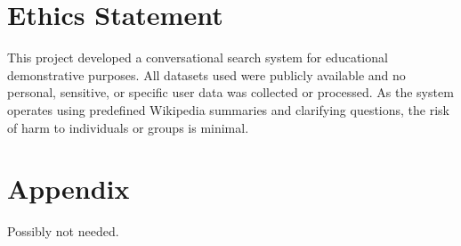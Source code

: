 \documentclass[11pt]{article}
\begin{document}
\section*{Ethics Statement}
This project developed a conversational search system for educational demonstrative purposes. All datasets used were publicly available and no personal, sensitive, or specific user data was collected or processed. As the system operates using predefined Wikipedia summaries and clarifying questions, the risk of harm to individuals or groups is minimal. 




\appendix

\section{Appendix}
Possibly not needed.
\end{document}
